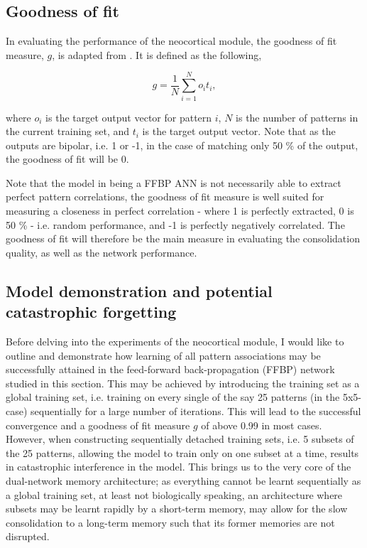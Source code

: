 \subsection{Goodness of fit}

In evaluating the performance of the neocortical module, the goodness of fit measure, $g$, is adapted from \citep{Hattori2010, Hattori2014}. It is defined as the following,

\begin{equation}
    g = \frac{1}{N} \sum_{i=1}^{N}o_it_i,
\end{equation}

where $o_i$ is the target output vector for pattern $i$, $N$ is the number of patterns in the current training set, and $t_i$ is the target output vector. Note that as the outputs are bipolar, i.e. 1 or -1, in the case of matching only 50 \% of the output, the goodness of fit will be 0.

Note that the model in being a FFBP ANN is not necessarily able to extract perfect pattern correlations, the goodness of fit measure is well suited for measuring a closeness in perfect correlation - where 1 is perfectly extracted, 0 is 50 \% - i.e. random performance, and -1 is perfectly negatively correlated.
The goodness of fit will therefore be the main measure in evaluating the consolidation quality, as well as the network performance.

\subsection{Model demonstration and potential catastrophic forgetting}

Before delving into the experiments of the neocortical module, I would like to outline and demonstrate how learning of all pattern associations may be successfully attained in the feed-forward back-propagation (FFBP) network studied in this section. This may be achieved by introducing the training set as a global training set, i.e. training on every single of the say 25 patterns (in the 5x5-case) sequentially for a large number of iterations. This will lead to the successful convergence and a goodness of fit measure $g$ of above 0.99 in most cases. However, when constructing sequentially detached training sets, i.e. 5 subsets of the 25 patterns, allowing the model to train only on one subset at a time, results in catastrophic interference in the model. This brings us to the very core of the dual-network memory architecture; as everything cannot be learnt sequentially as a global training set, at least not biologically speaking, an architecture where subsets may be learnt rapidly by a short-term memory, may allow for the slow consolidation to a long-term memory such that its former memories are not disrupted.

